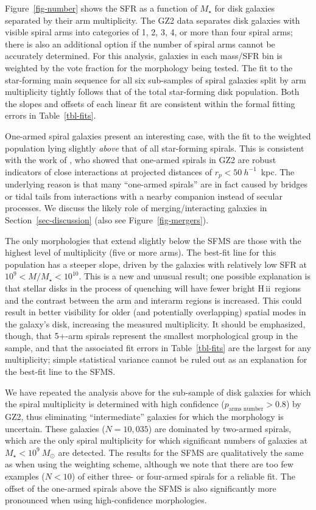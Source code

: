 \documentclass[useAMS,usenatbib]{mn2e}
\begin{document}
Figure~\ref{fig-number} shows the SFR as a function of $M_\star$ for disk galaxies separated by their arm multiplicity. The GZ2 data separates disk galaxies with visible spiral arms into categories of 1, 2, 3, 4, or more than four spiral arms; there is also an additional option if the number of spiral arms cannot be accurately determined. For this analysis, galaxies in each mass/SFR bin is weighted by the vote fraction for the morphology being tested. The fit to the star-forming main sequence for all six sub-samples of spiral galaxies split by arm multiplicity tightly follows that of the total star-forming disk population. Both the slopes and offsets of each linear fit are consistent within the formal fitting errors in Table~\ref{tbl-fits}.

One-armed spiral galaxies present an interesting case, with the fit to the weighted population lying slightly \emph{above} that of all star-forming spirals. This is consistent with the work of \citet{cas13}, who showed that one-armed spirals in GZ2 are robust indicators of close interactions at projected distances of $r_p < 50~h^{-1}$~kpc. The underlying reason is that many ``one-armed spirals'' are in fact caused by bridges or tidal tails from interactions with a nearby companion instead of secular processes. We discuss the likely role of merging/interacting galaxies in Section~\ref{sec-discussion} (also see Figure~\ref{fig-mergers}).

The only morphologies that extend slightly below the SFMS are those with the highest level of multiplicity (five or more arms). The best-fit line for this population has a steeper slope, driven by the galaxies with relatively low SFR at $10^9<M/M_\star<10^{10}$. This is a new and unusual result; one possible explanation is that stellar disks in the process of quenching will have fewer bright \mbox{H\,{\sc ii}}~regions and the contrast between the arm and interarm regions is increased. This could result in better visibility for older (and potentially overlapping) spatial modes in the galaxy's disk, increasing the measured multiplicity. It should be emphasized, though, that 5+-arm spirals represent the smallest morphological group in the sample, and that the associated fit errors in Table~\ref{tbl-fits} are the largest for any multiplicity; simple statistical variance cannot be ruled out as an explanation for the best-fit line to the SFMS.

We have repeated the analysis above for the sub-sample of disk galaxies for which the spiral multiplicity is determined with high confidence ($p_\textrm{arms~number} > 0.8$) by GZ2, thus eliminating ``intermediate'' galaxies for which the morphology is uncertain. These galaxies ($N=10,035$) are dominated by two-armed spirals, which are the only spiral multiplicity for which significant numbers of galaxies at $M_\star<10^9~M_\odot$ are detected. The results for the SFMS are qualitatively the same as when using the weighting scheme, although we note that there are too few examples ($N<10$) of either three- or four-armed spirals for a reliable fit. The offset of the one-armed spirals above the SFMS is also significantly more pronounced when using high-confidence morphologies.
\end{document}
